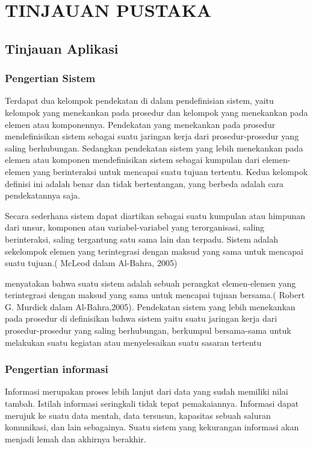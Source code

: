 \documentclass{jtetiproposalskripsi}
\begin{document}
\chapter{TINJAUAN PUSTAKA}               
\section{Tinjauan Aplikasi}
\subsection{Pengertian Sistem}
Terdapat dua kelompok pendekatan di dalam pendefinisian sistem, yaitu kelompok yang menekankan pada prosedur dan kelompok yang menekankan pada elemen atau komponennya. Pendekatan yang menekankan pada prosedur mendefinisikan sistem sebagai suatu jaringan kerja dari prosedur-prosedur yang saling berhubungan. Sedangkan pendekatan sistem yang lebih menekankan pada elemen atau komponen mendefinisikan sistem sebagai kumpulan dari elemen-elemen yang berinteraksi untuk mencapai suatu tujuan tertentu. Kedua kelompok definisi ini adalah benar dan tidak bertentangan, yang berbeda adalah cara pendekatannya saja.

	Secara sederhana sistem dapat diartikan sebagai suatu kumpulan atau himpunan dari unsur, komponen atau variabel-variabel yang terorganisasi, saling berinteraksi, saling tergantung satu sama lain dan terpadu.
	Sistem adalah sekelompok elemen yang terintegrasi dengan maksud yang sama untuk mencapai suatu tujuan.( McLeod dalam Al-Bahra, 2005)
	
menyatakan bahwa suatu sistem adalah sebuah perangkat elemen-elemen yang terintegrasi dengan maksud yang sama untuk mencapai tujuan bersama.( Robert G. Murdick dalam Al-Bahra,2005).
	Pendekatan sistem yang lebih menekankan pada prosedur di definisikan bahwa sistem yaitu suatu jaringan kerja dari prosedur-prosedur yang saling berhubungan, berkumpul bersama-sama untuk melakukan suatu kegiatan atau menyelesaikan suatu sasaran tertentu 

\subsection{Pengertian informasi}
Informasi merupakan proses lebih lanjut dari data yang sudah memiliki nilai tambah. Istilah informasi seringkali tidak tepat pemakaiannya. Informasi dapat merujuk ke suatu data mentah, data tersusun, kapasitas sebuah saluran komunikasi, dan lain sebagainya. Suatu sistem yang kekurangan informasi akan menjadi lemah dan akhirnya berakhir.
\end{document}

